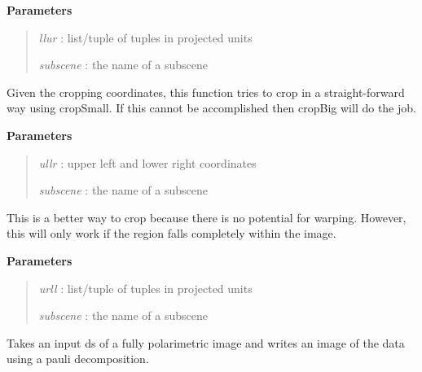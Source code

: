 \documentclass[letterpaper,10pt,openany,oneside]{sphinxmanual}
\begin{document}
\begin{fulllineitems}
\begin{fulllineitems}
\textbf{Parameters}
\begin{quote}

\emph{llur}     : list/tuple of tuples in projected units

\emph{subscene} : the name of a subscene
\end{quote}

\end{fulllineitems}


\begin{fulllineitems}
\label{code:Image.Image.cropImg}
Given the cropping coordinates, this function tries to crop in a straight-forward way using cropSmall.
If this cannot be accomplished then cropBig will do the job.

\textbf{Parameters}
\begin{quote}

\emph{ullr}     : upper left and lower right coordinates

\emph{subscene} : the name of a subscene
\end{quote}

\end{fulllineitems}


\begin{fulllineitems}
\label{code:Image.Image.cropSmall}
This is a better way to crop because there is no potential for warping.
However, this will only work if the region falls completely within the image.

\textbf{Parameters}
\begin{quote}

\emph{urll}     : list/tuple of tuples in projected units

\emph{subscene} : the name of a subscene
\end{quote}

\end{fulllineitems}


\begin{fulllineitems}
\label{code:Image.Image.decomp}
Takes an input ds of a fully polarimetric image and writes an image of
the data using a pauli decomposition.


\end{fulllineitems}
\end{fulllineitems}
\end{document}
